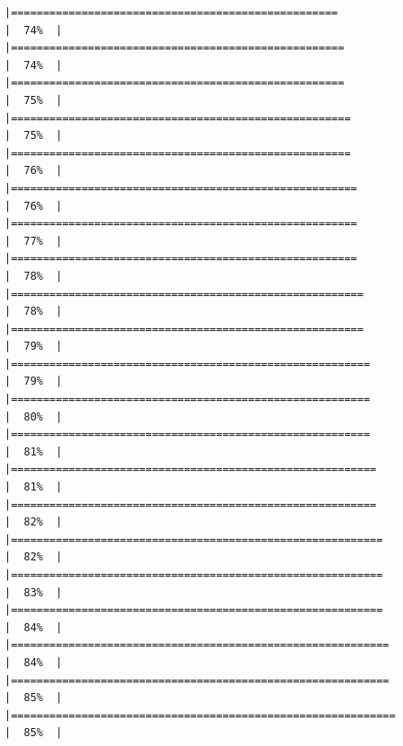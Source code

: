 \documentclass[
  bookmarksnumbered]{article}
\begin{document}
\begin{verbatim}
|===================================================                   |  74%  |                                                                              |====================================================                  |  74%  |                                                                              |====================================================                  |  75%  |                                                                              |=====================================================                 |  75%  |                                                                              |=====================================================                 |  76%  |                                                                              |======================================================                |  76%  |                                                                              |======================================================                |  77%  |                                                                              |======================================================                |  78%  |                                                                              |=======================================================               |  78%  |                                                                              |=======================================================               |  79%  |                                                                              |========================================================              |  79%  |                                                                              |========================================================              |  80%  |                                                                              |========================================================              |  81%  |                                                                              |=========================================================             |  81%  |                                                                              |=========================================================             |  82%  |                                                                              |==========================================================            |  82%  |                                                                              |==========================================================            |  83%  |                                                                              |==========================================================            |  84%  |                                                                              |===========================================================           |  84%  |                                                                              |===========================================================           |  85%  |                                                                              |============================================================          |  85%  |                                                                              
\end{verbatim}
\end{document}
